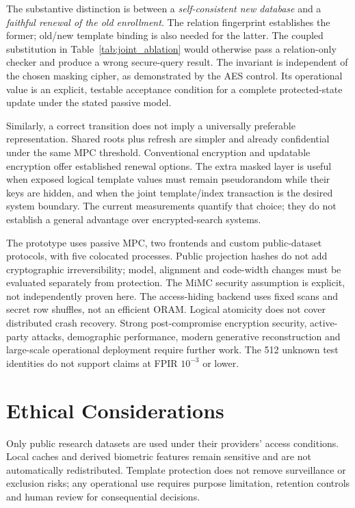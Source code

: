 \documentclass[journal]{IEEEtran}
\begin{document}
The substantive distinction is between a \emph{self-consistent new database} and a \emph{faithful renewal of the old enrollment}. The relation fingerprint establishes the former; old/new template binding is also needed for the latter. The coupled substitution in Table~\ref{tab:joint_ablation} would otherwise pass a relation-only checker and produce a wrong secure-query result. The invariant is independent of the chosen masking cipher, as demonstrated by the AES control. Its operational value is an explicit, testable acceptance condition for a complete protected-state update under the stated passive model.

Similarly, a correct transition does not imply a universally preferable representation. Shared roots plus refresh are simpler and already confidential under the same MPC threshold. Conventional encryption and updatable encryption offer established renewal options. The extra masked layer is useful when exposed logical template values must remain pseudorandom while their keys are hidden, and when the joint template/index transaction is the desired system boundary. The current measurements quantify that choice; they do not establish a general advantage over encrypted-search systems.

The prototype uses passive MPC, two frontends and custom public-dataset protocols, with five colocated processes. Public projection hashes do not add cryptographic irreversibility; model, alignment and code-width changes must be evaluated separately from protection. The MiMC security assumption is explicit, not independently proven here. The access-hiding backend uses fixed scans and secret row shuffles, not an efficient ORAM. Logical atomicity does not cover distributed crash recovery. Strong post-compromise encryption security, active-party attacks, demographic performance, modern generative reconstruction and large-scale operational deployment require further work. The 512 unknown test identities do not support claims at FPIR $10^{-3}$ or lower.

\section{Ethical Considerations}\label{sec:ethics}
Only public research datasets are used under their providers' access conditions. Local caches and derived biometric features remain sensitive and are not automatically redistributed. Template protection does not remove surveillance or exclusion risks; any operational use requires purpose limitation, retention controls and human review for consequential decisions.
\end{document}
